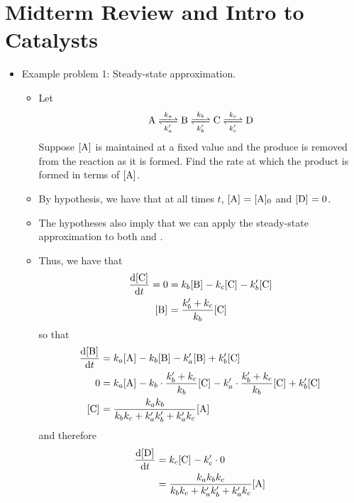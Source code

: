 \documentclass[../notes.tex]{subfiles}
\begin{document}
\section{Midterm Review and Intro to Catalysts}
\begin{itemize}
    \item {}Example problem 1: Steady-state approximation.
    \begin{itemize}
        \item Let
        \begin{equation*}
            \ce{A <=>[$k_a$][$k_a'$] B <=>[$k_b$][$k_b'$] C <=>[$k_c$][$k_c'$] D}
        \end{equation*}
        Suppose $\cnc{A}$ is maintained at a fixed value and the produce  is removed from the reaction as it is formed. Find the rate at which the product is formed in terms of $\cnc{A}$.
        \item By hypothesis, we have that at all times $t$, $\cnc{A}=\cnc[0]{A}$ and $\cnc{D}=0$.
        \item The hypotheses also imply that we can apply the steady-state approximation to both  and .
        \item Thus, we have that
        \begin{align*}
            \dv{\cnc{C}}{t} = 0 &= k_b\cnc{B}-k_c\cnc{C}-k_b'\cnc{C}\\
            \cnc{B} &= \frac{k_b'+k_c}{k_b}\cnc{C}
        \end{align*}
        so that
        \begin{align*}
            \dv{\cnc{B}}{t} &= k_a\cnc{A}-k_b\cnc{B}-k_a'\cnc{B}+k_b'\cnc{C}\\
            0 &= k_a\cnc{A}-k_b\cdot\frac{k_b'+k_c}{k_b}\cnc{C}-k_a'\cdot\frac{k_b'+k_c}{k_b}\cnc{C}+k_b'\cnc{C}\\
            \cnc{C} &= \frac{k_ak_b}{k_bk_c+k_a'k_b'+k_a'k_c}\cnc{A}
        \end{align*}
        and therefore
        \begin{align*}
            \dv{\cnc{D}}{t} &= k_c\cnc{C}-k_c'\cdot 0\\
            &= \frac{k_ak_bk_c}{k_bk_c+k_a'k_b'+k_a'k_c}\cnc{A}
        \end{align*}
    \end{itemize}

\end{itemize}
\end{document}
